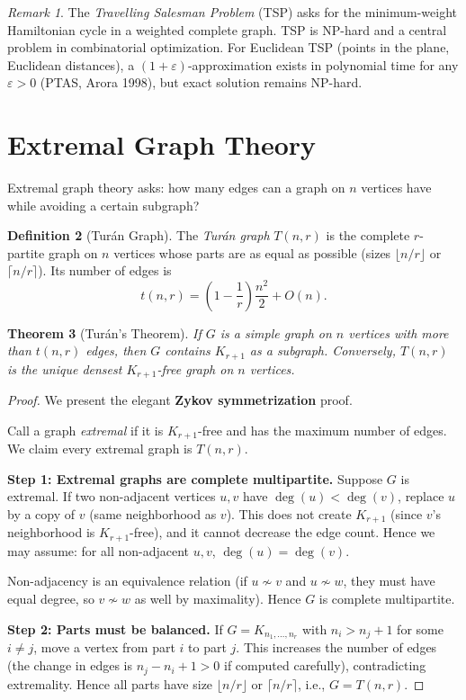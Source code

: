 \documentclass[12pt,a4paper]{amsart}
\newtheorem{theorem}{Theorem}[section]
\theoremstyle{definition}
\newtheorem{definition}[theorem]{Definition}
\theoremstyle{remark}
\newtheorem{remark}[theorem]{Remark}
\begin{document}
\begin{remark}
The \emph{Travelling Salesman Problem} (TSP) asks for the minimum-weight
Hamiltonian cycle in a weighted complete graph. TSP is NP-hard and a central
problem in combinatorial optimization. For Euclidean TSP (points in the plane,
Euclidean distances), a $(1+\varepsilon)$-approximation exists in polynomial
time for any $\varepsilon > 0$ (PTAS, Arora 1998), but exact solution remains
NP-hard.
\end{remark}

\section{Extremal Graph Theory}
\label{sec:extremal}

Extremal graph theory asks: how many edges can a graph on $n$ vertices have
while avoiding a certain subgraph?

\begin{definition}[Tur\'{a}n Graph]
The \emph{Tur\'{a}n graph} $T(n, r)$ is the complete $r$-partite graph on
$n$ vertices whose parts are as equal as possible (sizes $\lfloor n/r \rfloor$
or $\lceil n/r \rceil$). Its number of edges is
\[
  t(n, r) = \left(1 - \frac{1}{r}\right)\frac{n^2}{2}
            + O(n).
\]
\end{definition}

\begin{theorem}[Tur\'{a}n's Theorem]
\label{thm:turan}
If $G$ is a simple graph on $n$ vertices with more than $t(n, r)$ edges,
then $G$ contains $K_{r+1}$ as a subgraph. Conversely, $T(n,r)$ is the
unique densest $K_{r+1}$-free graph on $n$ vertices.
\end{theorem}

\begin{proof}
We present the elegant \textbf{Zykov symmetrization} proof.

Call a graph \emph{extremal} if it is $K_{r+1}$-free and has the maximum
number of edges. We claim every extremal graph is $T(n,r)$.

\textbf{Step 1: Extremal graphs are complete multipartite.}
Suppose $G$ is extremal. If two non-adjacent vertices $u, v$ have
$\deg(u) < \deg(v)$, replace $u$ by a copy of $v$ (same neighborhood as $v$).
This does not create $K_{r+1}$ (since $v$'s neighborhood is $K_{r+1}$-free),
and it cannot decrease the edge count. Hence we may assume: for all non-adjacent
$u,v$, $\deg(u) = \deg(v)$.

Non-adjacency is an equivalence relation (if $u \not\sim v$ and $u \not\sim w$,
they must have equal degree, so $v \not\sim w$ as well by maximality). Hence
$G$ is complete multipartite.

\textbf{Step 2: Parts must be balanced.}
If $G = K_{n_1, \ldots, n_r}$ with $n_i > n_j + 1$ for some $i \ne j$, move
a vertex from part $i$ to part $j$. This increases the number of edges (the
change in edges is $n_j - n_i + 1 > 0$ if computed carefully), contradicting
extremality. Hence all parts have size $\lfloor n/r\rfloor$ or $\lceil n/r\rceil$,
i.e., $G = T(n,r)$.
\end{proof}
\end{document}
